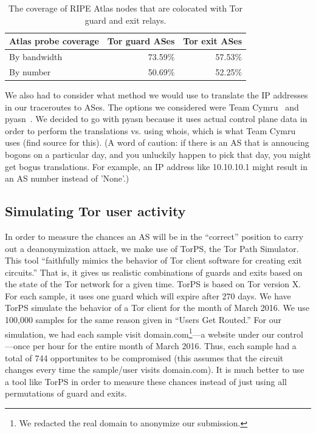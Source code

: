 

\begin{table}[t]
	\caption{The coverage of RIPE Atlas nodes that are colocated with Tor guard and exit
	relays.}
	\label{tab:atlas-coverage}
	\centering
	\begin{tabular}{l|r r}
	\toprule
	\textbf{Atlas probe coverage} & \textbf{Tor guard ASes} & \textbf{Tor exit ASes} \\
	\midrule
	By bandwidth & 73.59\% & 57.53\% \\
	By number & 50.69\% & 52.25\% \\
	\bottomrule
	\end{tabular}
\end{table}

We also had to consider what method we would use to translate the IP addresses in
our traceroutes to ASes. The options we considered were Team Cymru~\cite{ipasn}
and pyasn~\cite{pyasn}. We decided to go with pyasn because it uses actual
control plane data in order to perform the translations vs. using whois, which
is what Team Cymru uses (find source for this).  (A word of caution: if there is
an AS that is annoucing bogons on a particular day, and you unluckily happen to
pick that day, you might get bogus translations. For example, an IP address like
10.10.10.1 might result in an AS number instead of 'None'.)

\subsection{Simulating Tor user activity}
In order to measure the chances an AS will be in the ``correct'' position to carry out a
deanonymization attack, we make use of TorPS, the Tor Path Simulator. This tool 
``faithfully mimics the behavior of Tor client software for creating exit circuits.''
That is, it gives us realistic combinations of guards and exits based on the state of the 
Tor network for a given time. TorPS is based on Tor version X. For each sample, it uses 
one guard which will expire after 270 days. We have TorPS simulate the behavior of a Tor 
client for the month of March 2016. We use 100,000 samples for the same reason given in
``Users Get Routed.''  For our simulation, we had each sample 
visit domain.com\footnote{We redacted the real domain to anonymize our
submission.}---a website under our control---once per hour for the entire month
of March 2016.  Thus, each sample had a total of 744 opportunites to be
compromised (this assumes that the circuit changes every time the sample/user
visits domain.com).  It is much better to use a tool like TorPS in order to
measure these chances instead of just using all permutations of guard and exits.

